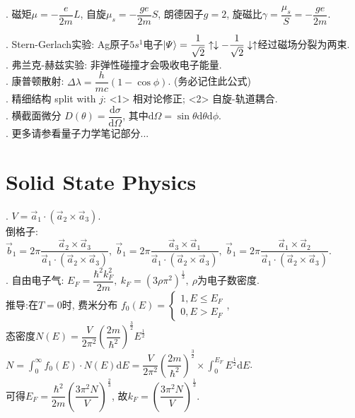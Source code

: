 \documentclass[12pt, 
]{article}
\begin{document}
. 磁矩$\mu=-\dfrac{e}{2m}L$, 自旋$\mu_s=-\dfrac{ge}{2m}S$, 朗德因子$g=2$, 旋磁比$\gamma=\dfrac{\mu_s}{S}=-\dfrac{ge}{2m}$.
~\\

. Stern-Gerlach实验: Ag原子$5s^1$电子$\ket{\varPsi}=\dfrac{1}{\sqrt{2}}\uparrow\downarrow-\dfrac{1}{\sqrt{2}}\downarrow\uparrow$经过磁场分裂为两束.
~\\

. 弗兰克-赫兹实验: 非弹性碰撞才会吸收电子能量.
~\\

. 康普顿散射: $\Delta\lambda=\dfrac{h}{mc}(1-\cos\phi)$. (务必记住此公式)
~\\

. 精细结构 split with $j$: <1> 相对论修正; <2> 自旋-轨道耦合.
~\\

. 横截面微分 $D(\theta)=\dfrac{\mathrm{d}\sigma}{\mathrm{d}\Omega}$, 其中$\mathrm{d}\Omega=\sin\theta\mathrm{d}\theta\mathrm{d}\phi$.
~\\

. 更多请参看量子力学笔记部分...

\newpage
\section{Solid State Physics}
. $V=\vec{a}_1\cdot(\vec{a}_2\times\vec{a}_3)$. 
~\\\phantom{~~~~~}倒格子: $\vec{b}_1=2\pi\dfrac{\vec{a}_2\times\vec{a}_3}{\vec{a}_1\cdot(\vec{a}_2\times\vec{a}_3)},~\vec{b}_1=2\pi\dfrac{\vec{a}_3\times\vec{a}_1}{\vec{a}_1\cdot(\vec{a}_2\times\vec{a}_3)},~\vec{b}_1=2\pi\dfrac{\vec{a}_1\times\vec{a}_2}{\vec{a}_1\cdot(\vec{a}_2\times\vec{a}_3)}$.
~\\

. 自由电子气: $E_F=\dfrac{\hbar^2k_F^2}{2m},~k_F=(3\rho\pi^2)^{\frac{1}{3}},~\rho$为电子数密度.
~\\\phantom{~~~~~自由~~}推导:在$T=0$时, 费米分布
$f_0(E)=\left\{\begin{array}{l}1, E\leqslant E_F\\0, E>E_F\end{array}\right.$,
~\\\phantom{~~~~自由电子气:~}态密度$N(E)=\dfrac{V}{2\pi^2}\left(\dfrac{2m}{\hbar^2}\right)^{\frac{3}{2}}E^{\frac{1}{2}}$
~\\\phantom{~~~~自由电子气:~态密度}$N=\displaystyle\int_0^\infty f_0(E)\cdot N(E)\mathrm{d}E=\dfrac{V}{2\pi^2}\left(\dfrac{2m}{\hbar^2}\right)^{\frac{3}{2}}\times\int_0^{E_F}E^{\frac{1}{2}}\mathrm{d}E$.
~\\\phantom{~~~~自由电子气:~}可得$E_F=\dfrac{\hbar^2}{2m}\left(\dfrac{3\pi^2 N}{V}\right)^{\frac{2}{3}}$, 故$k_F=\left(\dfrac{3\pi^2 N}{V}\right)^{\frac{1}{3}}$.
~\\
\end{document}
